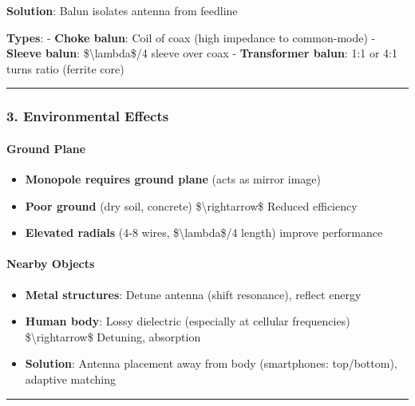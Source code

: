 \textbf{Solution}: Balun isolates antenna from feedline

\textbf{Types}: - \textbf{Choke balun}: Coil of coax (high impedance to
common-mode) - \textbf{Sleeve balun}: \$\textbackslash lambda\$/4 sleeve
over coax - \textbf{Transformer balun}: 1:1 or 4:1 turns ratio (ferrite
core)

\begin{center}\rule{0.5\linewidth}{0.5pt}\end{center}

\subsubsection{3. Environmental Effects}\label{environmental-effects}

\paragraph{Ground Plane}\label{ground-plane}

\begin{itemize}
\tightlist
\item
  \textbf{Monopole requires ground plane} (acts as mirror image)
\item
  \textbf{Poor ground} (dry soil, concrete)
  \$\textbackslash rightarrow\$ Reduced efficiency
\item
  \textbf{Elevated radials} (4-8 wires, \$\textbackslash lambda\$/4
  length) improve performance
\end{itemize}

\paragraph{Nearby Objects}\label{nearby-objects}

\begin{itemize}
\tightlist
\item
  \textbf{Metal structures}: Detune antenna (shift resonance), reflect
  energy
\item
  \textbf{Human body}: Lossy dielectric (especially at cellular
  frequencies) \$\textbackslash rightarrow\$ Detuning, absorption
\item
  \textbf{Solution}: Antenna placement away from body (smartphones:
  top/bottom), adaptive matching
\end{itemize}

\begin{center}\rule{0.5\linewidth}{0.5pt}\end{center}

